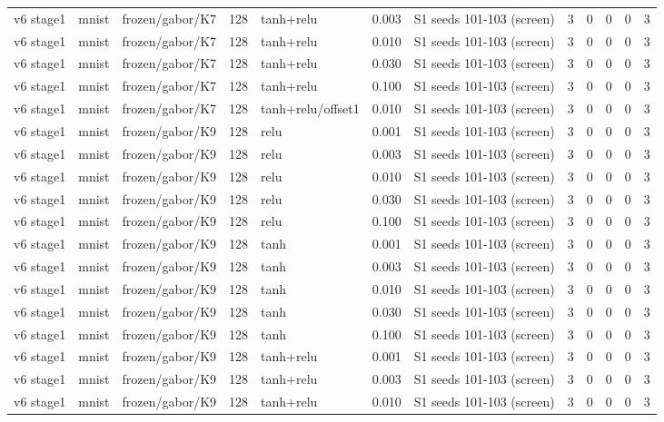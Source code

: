 \begin{table}[htbp]
{\begin{tabular}{@{}lllrlrlrrrrr@{}}
v6 stage1 & mnist & frozen/gabor/K7 & 128 & tanh+relu & 0.003 & S1 seeds 101-103 (screen) & 3 & 0 & 0 & 0 & 3 \\
v6 stage1 & mnist & frozen/gabor/K7 & 128 & tanh+relu & 0.010 & S1 seeds 101-103 (screen) & 3 & 0 & 0 & 0 & 3 \\
v6 stage1 & mnist & frozen/gabor/K7 & 128 & tanh+relu & 0.030 & S1 seeds 101-103 (screen) & 3 & 0 & 0 & 0 & 3 \\
v6 stage1 & mnist & frozen/gabor/K7 & 128 & tanh+relu & 0.100 & S1 seeds 101-103 (screen) & 3 & 0 & 0 & 0 & 3 \\
v6 stage1 & mnist & frozen/gabor/K7 & 128 & tanh+relu/offset1 & 0.010 & S1 seeds 101-103 (screen) & 3 & 0 & 0 & 0 & 3 \\
v6 stage1 & mnist & frozen/gabor/K9 & 128 & relu & 0.001 & S1 seeds 101-103 (screen) & 3 & 0 & 0 & 0 & 3 \\
v6 stage1 & mnist & frozen/gabor/K9 & 128 & relu & 0.003 & S1 seeds 101-103 (screen) & 3 & 0 & 0 & 0 & 3 \\
v6 stage1 & mnist & frozen/gabor/K9 & 128 & relu & 0.010 & S1 seeds 101-103 (screen) & 3 & 0 & 0 & 0 & 3 \\
v6 stage1 & mnist & frozen/gabor/K9 & 128 & relu & 0.030 & S1 seeds 101-103 (screen) & 3 & 0 & 0 & 0 & 3 \\
v6 stage1 & mnist & frozen/gabor/K9 & 128 & relu & 0.100 & S1 seeds 101-103 (screen) & 3 & 0 & 0 & 0 & 3 \\
v6 stage1 & mnist & frozen/gabor/K9 & 128 & tanh & 0.001 & S1 seeds 101-103 (screen) & 3 & 0 & 0 & 0 & 3 \\
v6 stage1 & mnist & frozen/gabor/K9 & 128 & tanh & 0.003 & S1 seeds 101-103 (screen) & 3 & 0 & 0 & 0 & 3 \\
v6 stage1 & mnist & frozen/gabor/K9 & 128 & tanh & 0.010 & S1 seeds 101-103 (screen) & 3 & 0 & 0 & 0 & 3 \\
v6 stage1 & mnist & frozen/gabor/K9 & 128 & tanh & 0.030 & S1 seeds 101-103 (screen) & 3 & 0 & 0 & 0 & 3 \\
v6 stage1 & mnist & frozen/gabor/K9 & 128 & tanh & 0.100 & S1 seeds 101-103 (screen) & 3 & 0 & 0 & 0 & 3 \\
v6 stage1 & mnist & frozen/gabor/K9 & 128 & tanh+relu & 0.001 & S1 seeds 101-103 (screen) & 3 & 0 & 0 & 0 & 3 \\
v6 stage1 & mnist & frozen/gabor/K9 & 128 & tanh+relu & 0.003 & S1 seeds 101-103 (screen) & 3 & 0 & 0 & 0 & 3 \\
v6 stage1 & mnist & frozen/gabor/K9 & 128 & tanh+relu & 0.010 & S1 seeds 101-103 (screen) & 3 & 0 & 0 & 0 & 3 \\

\end{tabular}}
\end{table}
